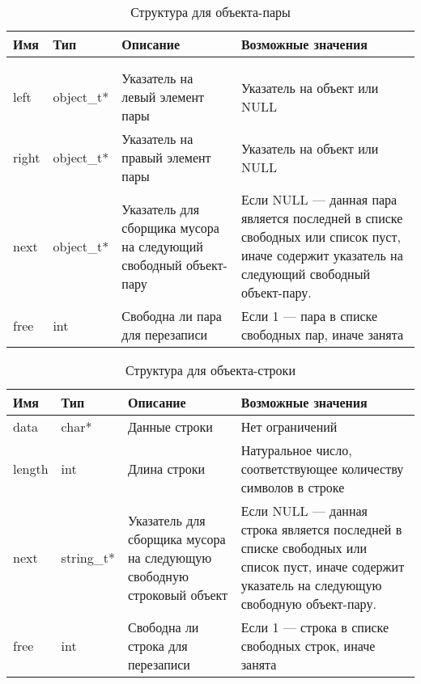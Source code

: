 \begin{xltabular}{\textwidth}{|l|l|p{5.7cm}|X|}
	\caption{Структура  для объекта-пары\label{strobjpair:table}}\\ \hline
	\centrow Имя & \centrow Тип & \centrow Описание & \centrow Возможные значения \\ \hline
	 &  &  &  \\ \hline
	\endfirsthead
	 &  &  &  \\ \hline
	\finishhead
	left & object\_t* & Указатель на левый элемент пары & Указатель на объект или NULL \\ \hline 
	right & object\_t* & Указатель на правый элемент пары & Указатель на объект или NULL \\ \hline 
	next & object\_t* & Указатель для сборщика мусора на следующий свободный объект-пару & Если NULL — данная пара является последней в списке свободных или список пуст, иначе содержит указатель на следующий свободный объект-пару. \\ \hline 
	free & int & Свободна ли пара для перезаписи  & Если 1 — пара в списке свободных пар, иначе занята
\end{xltabular}

\begin{xltabular}{\textwidth}{|l|l|p{5.7cm}|X|}
	\caption{Структура  для объекта-строки\label{strobjstr:table}}\\ \hline
	\centrow Имя & \centrow Тип & \centrow Описание & \centrow Возможные значения \\ \hline
	\finishhead
	data & char* & Данные строки & Нет ограничений \\ \hline 
	length & int & Длина строки & Натуральное число, соответствующее количеству символов в строке \\ \hline 
	next & string\_t* & Указатель для сборщика мусора на следующую свободную строковый объект & Если NULL — данная строка является последней в списке свободных или список пуст, иначе содержит указатель на следующую свободную объект-пару. \\ \hline 
	free & int & Свободна ли строка для перезаписи & Если 1 — строка в списке свободных строк, иначе занята
\end{xltabular}


